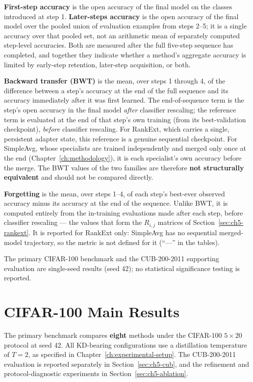 \textbf{First-step accuracy} is the open accuracy of the final model on
the classes introduced at step 1. \textbf{Later-steps accuracy} is the open
accuracy of the final model over the pooled union of evaluation examples
from steps 2--5; it is a single accuracy over that pooled set, not an
arithmetic mean of separately computed step-level accuracies. Both are
measured after the full five-step sequence has completed, and together
they indicate whether a method's aggregate accuracy is limited by
early-step retention, later-step acquisition, or both.

\textbf{Backward transfer (BWT)} \parencite{lopezpaz2017gradient} is the
mean, over steps 1 through 4, of the difference between a step's accuracy at
the end of the full sequence and its accuracy immediately after it was first
learned. The end-of-sequence term is the step's open accuracy in the final
model \emph{after} classifier rescaling; the reference term is evaluated at
the end of that step's own training (from its best-validation checkpoint),
\emph{before} classifier rescaling. For RankExt, which carries a single,
persistent adapter state, this reference is a genuine sequential
checkpoint. For SimpleAvg, whose specialists are trained independently and
merged only once at the end (Chapter~\ref{ch:methodology}), it is each
specialist's own accuracy before the merge. The BWT values of the two
families are therefore \textbf{not structurally equivalent} and should not
be compared directly.

\textbf{Forgetting} \parencite{chaudhry2018riemannian} is the mean, over
steps 1--4, of each step's best-ever observed accuracy minus its accuracy at
the end of the sequence. Unlike BWT, it is computed entirely from the
in-training evaluations made after each step, before classifier rescaling
--- the values that form the $R_{i,j}$ matrices of
Section~\ref{sec:ch5-rankext}. It is reported for RankExt only: SimpleAvg has
no sequential merged-model trajectory, so the metric is not defined for it
(``---'' in the tables).

The primary CIFAR-100 benchmark and the CUB-200-2011 supporting evaluation
are single-seed results (seed 42); no statistical significance testing is
reported.

\section{CIFAR-100 Main Results}
\label{sec:ch5-main-results}

The primary benchmark compares \textbf{eight} methods under the CIFAR-100
$5\times20$ protocol at seed 42. All KD-bearing configurations use a
distillation temperature of $T=2$, as specified in
Chapter~\ref{ch:experimental-setup}. The CUB-200-2011 evaluation is reported
separately in Section~\ref{sec:ch5-cub}, and the refinement and
protocol-diagnostic experiments in Section~\ref{sec:ch5-ablation}.

